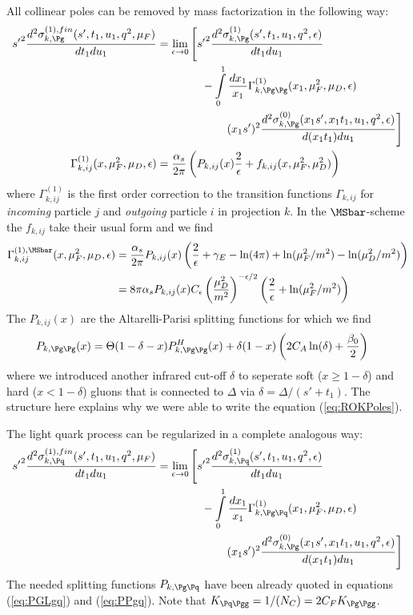 All collinear poles can be removed by mass factorization in the following way:
\begin{align}
{s'}^2\frac{d^2\sigma_{k,\Pg}^{(1),fin}(s',t_1,u_1,q^2,\mu_F)}{dt_1du_1} &= \lim_{\epsilon\rightarrow 0}\left[{s'}^2\frac{d^2\sigma_{k,\Pg}^{(1)}(s',t_1,u_1,q^2,\epsilon)}{dt_1du_1} \right.\nonumber\\
 &\hspace{40pt} -\int\limits_0^1\frac{dx_1}{x_1}\Gamma_{k,\Pg\Pg}^{(1)}(x_1,\mu_F^2,\mu_D,\epsilon)\\
 &\hspace{60pt}\left.(x_1s')^2\frac{d^2\sigma_{k,\Pg}^{(0)}(x_1s',x_1t_1,u_1,q^2,\epsilon)}{d(x_1t_1)du_1} \right]\\
\Gamma_{k,ij}^{(1)}(x,\mu_F^2,\mu_D,\epsilon) &= \frac{\alpha_s}{2\pi}\left(P_{k,ij}(x)\frac{2}{\epsilon} + f_{k,ij}(x,\mu_F^2,\mu_D^2)\right)
\end{align}
where $\Gamma_{k,ij}^{(1)}$ is the first order correction to the transition functions $\Gamma_{k,ij}$ for \textit{incoming} particle $j$ and \textit{outgoing} particle $i$ in projection $k$. In the $\MSbar$-scheme the $f_{k,ij}$ take their usual form and we find
\begin{align}
\Gamma_{k,ij}^{(1),\MSbar}(x,\mu_F^2,\mu_D,\epsilon) &= \frac{\alpha_s}{2\pi}P_{k,ij}(x)\left(\frac{2}{\epsilon} +\gamma_E - \ln(4\pi) + \ln(\mu_F^2/m^2) - \ln(\mu_D^2/m^2)\right)\\
 &= 8\pi\alpha_s P_{k,ij}(x) C_\epsilon \left(\frac{\mu_D^2}{m^2}\right)^{-\epsilon/2} \left(\frac{2}{\epsilon} + \ln(\mu_F^2/m^2)\right)
\end{align}
The $P_{k,ij}(x)$ are the Altarelli-Parisi splitting functions for which we find\cite{Altarelli:1977zs,Vogelsang:1995vh}
\begin{align}
P_{k,\Pg\Pg}(x) &= \Theta(1-\delta-x)P_{k,\Pg\Pg}^H(x)+\delta(1-x)\left(2C_A\ln(\delta)+\frac{\beta_0}{2}\right)
\end{align}
where we introduced another infrared cut-off $\delta$ to seperate soft ($x\geq 1-\delta$) and hard ($x<1-\delta$) gluons that is connected to $\Delta$ via $\delta=\Delta/(s'+t_1)$. The structure here explains why we were able to write the equation (\ref{eq:ROKPoles}).

The light quark process can be regularized in a complete analogous way:
\begin{align}
{s'}^2\frac{d^2\sigma_{k,\Pq}^{(1),fin}(s',t_1,u_1,q^2,\mu_F)}{dt_1du_1} &= \lim_{\epsilon\rightarrow 0}\left[{s'}^2\frac{d^2\sigma_{k,\Pq}^{(1)}(s',t_1,u_1,q^2,\epsilon)}{dt_1du_1} \right.\nonumber\\
 &\hspace{40pt}-\int\limits_0^1\frac{dx_1}{x_1}\Gamma_{k,\Pg\Pq}^{(1)}(x_1,\mu_F^2,\mu_D,\epsilon)\nonumber\\
 &\hspace{60pt}\left.(x_1s')^2\frac{d^2\sigma_{k,\Pg}^{(0)}(x_1s',x_1t_1,u_1,q^2,\epsilon)}{d(x_1t_1)du_1} \right] \label{eq:qMassFact}
\end{align}
The needed splitting functions $P_{k,\Pg\Pq}$ have been already quoted in equations (\ref{eq:PGLgq}) and (\ref{eq:PPgq}). Note that $K_{\Pq\Pgg} = 1/(N_C) = 2C_FK_{\Pg\Pgg}$.

